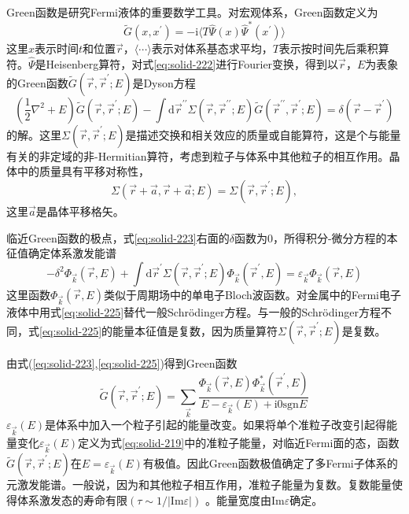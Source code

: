 {Green函数是研究Fermi液体的重要数学工具。对宏观体系，Green函数定义为%
\begin{equation}
	\tilde G(x,x^{\prime})=-\mathrm{i}\langle T\hat\Psi(x)\hat\Psi^{\ast}(x^{\prime})\rangle
  \label{eq:solid-222}
\end{equation}
这里$x$表示时间$t$和位置$\vec r$，$\langle\cdots\rangle$表示对体系基态求平均，$T$表示按时间先后乘积算符。$\hat\Psi$是Heisenberg算符，对式\eqref{eq:solid-222}进行Fourier变换，得到以$\vec r$，$E$为表象的Green函数$\tilde G(\vec r,\vec r^{\prime};E)$是Dyson方程\cite{Lifshitz}
\begin{equation}
	(\dfrac12\nabla^2+E)\tilde G(\vec r,\vec r^{\prime};E)-\int\mathrm{d}\vec r^{\prime\prime}\Sigma(\vec r,\vec r^{\prime\prime};E)\tilde G(\vec r^{\prime\prime},\vec r^{\prime};E)=\delta(\vec r-\vec r^{\prime})
  \label{eq:solid-223}
\end{equation}
的解。这里$\Sigma(\vec r,\vec r^{\prime};E)$是描述交换和相关效应的质量或自能算符，这是个与能量有关的非定域的非-Hermitian算符，考虑到粒子与体系中其他粒子的相互作用。晶体中的质量具有平移对称性，
\begin{equation}
  \Sigma(\vec r+\vec a,\vec r+\vec a;E)=\Sigma(\vec r,\vec r^{\prime};E),
  \label{eq:solid:224}
\end{equation}
这里$\vec a$是晶体平移格矢。

临近Green函数的极点，式\eqref{eq:solid-223}右面的$\delta$函数为0，所得积分-微分方程的本征值确定体系激发能谱%
\begin{equation}
	-\delta^2\Phi_{\vec k}(\vec r,E)+\int\mathrm{d}\vec r^{\prime}\Sigma(\vec r,\vec r^{\prime};E)\Phi_{\vec k}(\vec r^{\prime},E)=\varepsilon_{\vec k}\Phi_{\vec k}(\vec r,E) 
  \label{eq:solid-225}
\end{equation}
这里函数$\Phi_{\vec k}(\vec r,E)$类似于周期场中的单电子Bloch波函数。对金属中的Fermi电子液体中用式\eqref{eq:solid-225}替代一般Schr\"odinger方程。与一般的Schr\"odinger方程不同，式\eqref{eq:solid-225}的能量本征值是复数，因为质量算符$\Sigma(\vec r,\vec r^{\prime};E)$是复数。

由式(\ref{eq:solid-223},\ref{eq:solid-225})得到Green函数
\begin{equation}
	\tilde G(\vec r,\vec r^{\prime};E)=\sum_{\vec k}\frac{\Phi_{\vec k}(\vec r,E)\Phi_{\vec k}^{\ast}(\vec r^{\prime},E)}{E-\varepsilon_{\vec k}(E)+\mathrm{i}0\mathrm{sgn}E}
  \label{eq:solid-226}
\end{equation}
$\varepsilon_{\vec k}(E)$是体系中加入一个粒子引起的能量改变。如果将单个准粒子改变引起得能量变化$\varepsilon_{\vec k}(E)$定义为式\eqref{eq:solid-219}中的准粒子能量，对临近Fermi面的态，函数$\tilde G(\vec r,\vec r^{\prime};E)$在$E=\varepsilon_{\vec k}(E)$有极值。因此Green函数极值确定了多Fermi子体系的元激发能谱。一般说，因为和其他粒子相互作用，准粒子能量为复数。复数能量使得体系激发态的寿命有限$(\tau\sim1/|\mathrm{Im}\varepsilon|)$%
。能量宽度由$\mathrm{Im}\varepsilon$确定。

}

